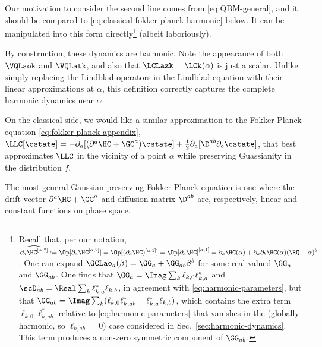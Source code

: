 \documentclass{article}
\numberwithin{equation}{section}
\begin{document}
Our motivation to consider the second line comes from \eqref{eq:QBM-general}, and it should be compared to \eqref{eq:classical-fokker-planck-harmonic} below. It can be manipulated into this form directly\footnote{Recall that, per our notation, $\widehat{\partial_a\HC^{[\alpha,2]}}:=\Op[\partial_a\HC^{[\alpha,2]}] = \Op[(\partial_a\HC)^{[\alpha,1]}]=\Op[\partial_a\HC]^{[\alpha,1]} = \partial_a\HC(\alpha)+\partial_a\partial_b\HC(\alpha)(\RQ-\alpha)^b$. 
One can expand $\GCLao_a(\beta) = \GG_a + \GG_{ab}\beta^b$ for some real-valued $\GG_a$ and $\GG_{ab}$. One finds that $\GG_a = \Imag \sum_k \ell_{k,0} \ell_{k,a}^*$ and $\scD_{ab} =  \Real \sum_k \ell_{k,a}^* \ell_{k,b}$, in agreement with \eqref{eq:harmonic-parameters}, but that $\GG_{ab} = \Imag \sum_k  (\ell_{k,0} \ell_{k,ab}^* + \ell_{k,a}^* \ell_{k,b})$, which contains the extra term $\ell_{k,0} \ell_{k,ab}^*$ relative to \eqref{eq:harmonic-parameters} that vanishes in the (globally harmonic, so $\ell_{k,ab}=0$) case considered in Sec.~\ref{sec:harmonic-dynamics}. This term produces a non-zero symmetric component of $\GG_{ab}$.} (albeit laboriously).

By construction, these dynamics are harmonic.
Note the appearance of both $\VQLaok$ and $\VQLatk$, and also that $\LCLazk=\LCk(\alpha)$ is just a scalar.  Unlike simply replacing the Lindblad operators in the Lindblad equation with their linear approximations at $\alpha$, this definition correctly captures the complete harmonic dynamics near $\alpha$.



On the classical side, we would like a similar approximation to the Fokker-Planck equation \eqref{eq:fokker-planck-appendix}, 
$\LLC [\cstate] = -\partial_a [(\partial^a\HC + \GC^a) \cstate]  +	\frac{1}{2} \partial_a [ \D^{ab} \partial_b \cstate]$,
that best approximates $\LLC$ in the vicinity of a point $\alpha$ while preserving Guassianity in the distribution $f$.

The most general Gaussian-preserving Fokker-Planck equation is one where the drift vector $\partial^a\HC + \GC^a$ and diffusion matrix $\D^{ab}$ are, respectively, linear and constant functions on phase space.
\end{document}
